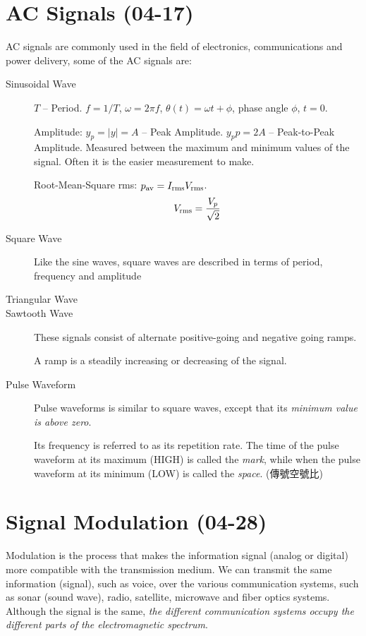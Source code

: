 \documentclass[a4paper,UTF8]{article}
\theoremstyle{mystyle}{
  \newtheorem{law}{Law}
}
\begin{document}
\section{AC Signals (04-17)}
AC signals are commonly used in the field of
electronics, communications and power delivery,
some of the AC signals are:
\begin{description}
\item[Sinusoidal Wave]
$T$ – Period. $f=1/T$, $\omega=2\pi f$, $\theta(t)=\omega t+\phi$,
phase angle $\phi$, $t=0$.

 Amplitude: $y_p = |y| = A$ – Peak Amplitude. $y_pp = 2A$ – Peak-to-Peak Amplitude. Measured between the maximum and
minimum values of the signal. Often it is
the easier measurement to make.

Root-Mean-Square rms: $p_{\rm av}=I_{\rm rms}V_{\rm rms}$.
\[
V_{\rm rms}=\frac{V_p}{\sqrt{2}}
\]
 
\item[Square Wave]
Like the sine waves, square waves are described in terms of
period, frequency and amplitude
\item[Triangular Wave]
\item[Sawtooth Wave]

These signals consist of alternate positive-going and negative
going ramps.

A ramp is a steadily increasing or decreasing of the signal.
\item[Pulse Waveform]
Pulse waveforms is similar to square waves, except that its \emph{minimum
value is above zero}.

Its frequency is referred to as its repetition rate. The time of the pulse
waveform at its maximum (HIGH) is called the \emph{mark}, while when the
pulse waveform at its minimum (LOW) is called the \emph{space}. 
(傳號空號比)
\end{description}

\section{Signal Modulation (04-28)}
Modulation is the process that makes the information
signal (analog or digital) more compatible with the
transmission medium.
We can transmit the same information (signal), such as
voice, over the various communication systems, such as
sonar (sound wave), radio, satellite, microwave and fiber
optics systems.
Although the signal is the same, \emph{the different
communication systems occupy the different parts of the
electromagnetic spectrum}.
\end{document}
